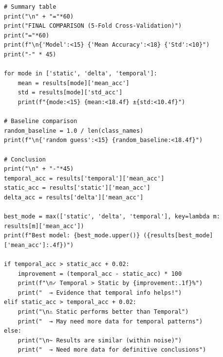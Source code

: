 \begin{lstlisting}
# Summary table
print("\n" + "="*60)
print("FINAL COMPARISON (5-Fold Cross-Validation)")
print("="*60)
print(f"\n{'Model':<15} {'Mean Accuracy':<18} {'Std':<10}")
print("-" * 45)
 
for mode in ['static', 'delta', 'temporal']:
    mean = results[mode]['mean_acc']
    std = results[mode]['std_acc']
    print(f"{mode:<15} {mean:<18.4f} ±{std:<10.4f}")
 
# Baseline comparison
random_baseline = 1.0 / len(class_names)
print(f"\n{'random guess':<15} {random_baseline:<18.4f}")
 
# Conclusion
print("\n" + "-"*45)
temporal_acc = results['temporal']['mean_acc']
static_acc = results['static']['mean_acc']
delta_acc = results['delta']['mean_acc']
 
best_mode = max(['static', 'delta', 'temporal'], key=lambda m: results[m]['mean_acc'])
print(f"Best model: {best_mode.upper()} ({results[best_mode]['mean_acc']:.4f})")
 
if temporal_acc > static_acc + 0.02:
    improvement = (temporal_acc - static_acc) * 100
    print(f"\n✓ Temporal > Static by {improvement:.1f}%")
    print("  → Evidence that temporal info helps!")
elif static_acc > temporal_acc + 0.02:
    print("\n⚠ Static performs better than Temporal")
    print("  → May need more data for temporal patterns")
else:
    print("\n~ Results are similar (within noise)")
    print("  → Need more data for definitive conclusions")
\end{lstlisting}
 
